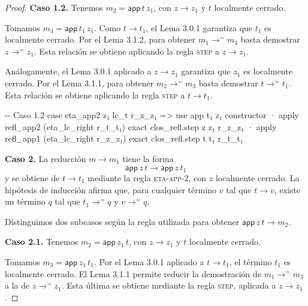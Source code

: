 \documentclass[
  spanish,
  letterpaper,
  DIV=11,
  numbers=noendperiod]{scrreprt}
\newenvironment{Shaded}{\begin{snugshade}}{\end{snugshade}}
\newcommand{\CommentTok}[1]{\textcolor[rgb]{0.37,0.37,0.37}{#1}}
\newcommand{\KeywordTok}[1]{\textcolor[rgb]{0.00,0.23,0.31}{\textbf{#1}}}
\newcommand{\NormalTok}[1]{\textcolor[rgb]{0.00,0.23,0.31}{#1}}
\renewcommand{\NormalTok}[1]{\textcolor[HTML]{000000}{#1}}
\renewcommand{\KeywordTok}[1]{\textcolor[HTML]{0000FF}{#1}}
\renewcommand{\CommentTok}[1]{\textcolor[HTML]{008000}{#1}}
\theoremstyle{remark}
\begin{document}
\begin{proof}
\textbf{Caso 1.2.} Tenemos \(m_2=\mathsf{app}\,t\,z_1\), con
\(z\longrightarrow z_1\) y \(t\) localmente cerrado.

Tomamos \(m_3=\mathsf{app}\,t_1\,z_1\). Como \(t\longrightarrow t_1\),
el Lema 3.0.1 garantiza que \(t_1\) es localmente cerrado. Por el Lema
3.1.2, para obtener \(m_1\longrightarrow^{=}m_3\) basta demostrar
\(z\longrightarrow^{=}z_1\). Esta relación se obtiene aplicando la regla
\textsc{step} a \(z\longrightarrow z_1\).

Análogamente, el Lema 3.0.1 aplicado a \(z\longrightarrow z_1\)
garantiza que \(z_1\) es localmente cerrado. Por el Lema 3.1.1, para
obtener \(m_2\longrightarrow^{=}m_3\) basta demostrar
\(t\longrightarrow^{=}t_1\). Esta relación se obtiene aplicando la regla
\textsc{step} a \(t\longrightarrow t_1\).

\begin{Shaded}
\begin{Highlighting}[]
    \CommentTok{{-}{-} Caso 1.2}
\NormalTok{    case eta\_app2 z₁ lc\_t r\_z\_z₁ =\textgreater{}}
\NormalTok{      use app t₁ z₁}
\NormalTok{      constructor}
\NormalTok{      · }\KeywordTok{apply}\NormalTok{ refl\_app2 (eta\_lc\_right r\_t\_t₁)}
        \KeywordTok{exact}\NormalTok{ clos\_refl.step z z₁ r\_z\_z₁}
\NormalTok{      · }\KeywordTok{apply}\NormalTok{ refl\_app1 (eta\_lc\_right r\_z\_z₁)}
        \KeywordTok{exact}\NormalTok{ clos\_refl.step t t₁ r\_t\_t₁}
\end{Highlighting}
\end{Shaded}

\textbf{Caso 2.} La reducción \(m\longrightarrow m_1\) tiene la forma \[
\mathsf{app}\,z\,t \longrightarrow \mathsf{app}\,z\,t_1
\] y se obtiene de \(t\longrightarrow t_1\) mediante la regla
\textsc{eta-app-2}, con \(z\) localmente cerrado. La hipótesis de
inducción afirma que, para cualquier término \(v\) tal que
\(t\longrightarrow v\), existe un término \(q\) tal que
\(t_1\longrightarrow^{=}q\) y \(v\longrightarrow^{=}q\).

Distinguimos dos subcasos según la regla utilizada para obtener
\(\mathsf{app}\,z\,t\longrightarrow m_2\).

\textbf{Caso 2.1.} Tenemos \(m_2=\mathsf{app}\,z_1\,t\), con
\(z\longrightarrow z_1\) y \(t\) localmente cerrado.

Tomamos \(m_3=\mathsf{app}\,z_1\,t_1\). Por el Lema 3.0.1 aplicado a
\(t\longrightarrow t_1\), el término \(t_1\) es localmente cerrado. El
Lema 3.1.1 permite reducir la demostración de
\(m_1\longrightarrow^{=}m_3\) a la de \(z\longrightarrow^{=}z_1\). Esta
última se obtiene mediante la regla \textsc{step}, aplicada a
\(z\longrightarrow z_1\).


\end{proof}
\end{document}
